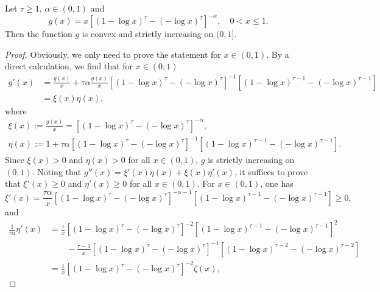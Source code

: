 \documentclass{aptpub}
\numberwithin{equation}{section}
\begin{document}
\section{}\label{app}


\begin{lem}\label{convex}
    Let $\tau\geq1$, $\alpha\in(0,1)$ and
    $$
        g(x)
        =x\left[(1-\log x)^\tau-(-\log x)^\tau\right]^{-\alpha},
        \quad 0<x\leq1.
    $$
    Then the function $g$ is convex and strictly increasing on $(0,1]$.
\end{lem}

\begin{proof}
    Obviously, we only need to prove the statement for $x\in(0,1)$. By a direct calculation, we find that for $x\in(0,1)$
    \begin{align*}
        g'(x)
        &= \frac{g(x)}{x} + \tau\alpha\frac{g(x)}{x} \left[(1-\log x)^\tau - (-\log x)^\tau \right]^{-1}
           \left[(1-\log x)^{\tau-1}- (-\log x)^{\tau-1} \right]\\
        &= \xi(x)\eta(x),
   \end{align*}
    where
    \begin{gather*}
        \xi(x)
        :=\frac{g(x)}{x}
        = \left[(1-\log x)^\tau-(-\log x)^\tau\right]^{-\alpha},\\
        \eta(x)
        :=1 + \tau\alpha\left[(1-\log x)^\tau - (-\log x)^\tau \right]^{-1}
        \left[(1-\log x)^{\tau-1} - (-\log x)^{\tau-1}\right].
    \end{gather*}
    Since $\xi(x)>0$ and $\eta(x)>0$ for all $x\in(0,1)$, $g$ is strictly increasing on $(0,1)$. Noting that $g''(x)=\xi'(x)\eta(x)+\xi(x)\eta'(x)$, it suffices to prove that $\xi'(x)\geq 0$ and $\eta'(x)\geq 0$ for all $x\in(0,1)$. For $x\in(0,1)$, one has
    $$
         \xi'(x)
         =\frac{\tau\alpha}{x} \left[(1-\log x)^\tau- (-\log x)^\tau \right]^{-\alpha-1} \left[(1-\log x)^{\tau-1}- (-\log x)^{\tau-1} \right]
         \geq 0,
    $$
    and
    \begin{align*}
        \frac{1}{\tau\alpha}\eta'(x)
        &= \frac{\tau}{x} \left[(1-\log x)^\tau- (-\log x)^\tau \right]^{-2} \left[(1-\log x)^{\tau-1}- (-\log x)^{\tau-1} \right]^2\\ &\qquad\mbox{}-\frac{\tau-1}{x} \left[(1-\log x)^\tau- (-\log x)^\tau \right]^{-1} \left[(1-\log x)^{\tau-2}- (-\log x)^{\tau-2} \right]\\
        &= \frac{1}{x} \left[(1-\log x)^\tau- (-\log x)^\tau \right]^{-2}\zeta(x),
    \end{align*}

\end{proof}
\end{document}
